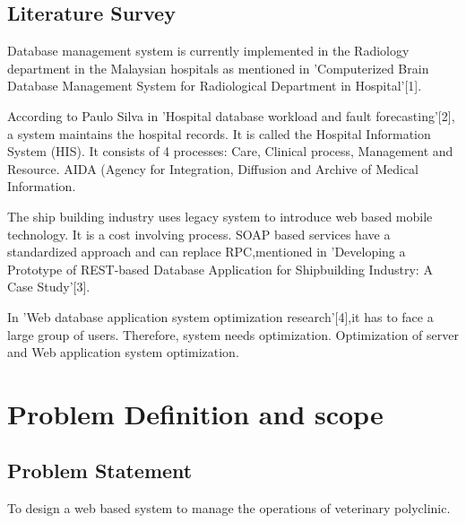 \documentclass[oneside,a4paper,12pt]{book}
\begin{document}
\section{Literature Survey}
\begin{enumerate}[{[1]}]
\item Database management system is currently implemented in the Radiology department in the Malaysian hospitals as mentioned in 'Computerized Brain Database Management System for Radiological Department in Hospital'[1].


\item According to Paulo Silva in 'Hospital database workload and fault forecasting'[2], a system maintains the hospital records. It is called the Hospital Information System (HIS). It consists of 4 processes: Care, Clinical process, Management and Resource. AIDA (Agency for Integration, Diffusion and Archive of Medical Information.

\item The ship building industry uses legacy system to introduce web based mobile technology. It is a cost involving process. SOAP based services have a standardized approach and can replace RPC,mentioned in 'Developing a Prototype of REST-based Database Application for Shipbuilding Industry: A Case Study'[3].



\item In 'Web database application system optimization research'[4],it has to face a large group of users. Therefore, system needs optimization. Optimization of server and Web application system optimization.
\end{enumerate}




\chapter{Problem Definition and scope}
\section{Problem Statement}
To design a web based system to manage the operations of veterinary polyclinic.
\end{document}
